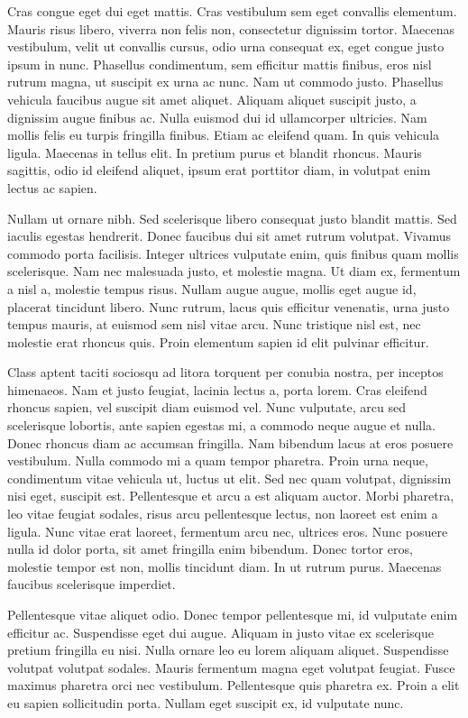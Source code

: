 \documentclass[12pt, a4paper]{article}
\begin{document}
Cras congue eget dui eget mattis. Cras vestibulum sem eget convallis elementum. Mauris risus libero, viverra non felis non, consectetur dignissim tortor. Maecenas vestibulum, velit ut convallis cursus, odio urna consequat ex, eget congue justo ipsum in nunc. Phasellus condimentum, sem efficitur mattis finibus, eros nisl rutrum magna, ut suscipit ex urna ac nunc. Nam ut commodo justo. Phasellus vehicula faucibus augue sit amet aliquet. Aliquam aliquet suscipit justo, a dignissim augue finibus ac. Nulla euismod dui id ullamcorper ultricies. Nam mollis felis eu turpis fringilla finibus. Etiam ac eleifend quam. In quis vehicula ligula. Maecenas in tellus elit. In pretium purus et blandit rhoncus. Mauris sagittis, odio id eleifend aliquet, ipsum erat porttitor diam, in volutpat enim lectus ac sapien.

Nullam ut ornare nibh. Sed scelerisque libero consequat justo blandit mattis. Sed iaculis egestas hendrerit. Donec faucibus dui sit amet rutrum volutpat. Vivamus commodo porta facilisis. Integer ultrices vulputate enim, quis finibus quam mollis scelerisque. Nam nec malesuada justo, et molestie magna. Ut diam ex, fermentum a nisl a, molestie tempus risus. Nullam augue augue, mollis eget augue id, placerat tincidunt libero. Nunc rutrum, lacus quis efficitur venenatis, urna justo tempus mauris, at euismod sem nisl vitae arcu. Nunc tristique nisl est, nec molestie erat rhoncus quis. Proin elementum sapien id elit pulvinar efficitur.

Class aptent taciti sociosqu ad litora torquent per conubia nostra, per inceptos himenaeos. Nam et justo feugiat, lacinia lectus a, porta lorem. Cras eleifend rhoncus sapien, vel suscipit diam euismod vel. Nunc vulputate, arcu sed scelerisque lobortis, ante sapien egestas mi, a commodo neque augue et nulla. Donec rhoncus diam ac accumsan fringilla. Nam bibendum lacus at eros posuere vestibulum. Nulla commodo mi a quam tempor pharetra. Proin urna neque, condimentum vitae vehicula ut, luctus ut elit. Sed nec quam volutpat, dignissim nisi eget, suscipit est. Pellentesque et arcu a est aliquam auctor. Morbi pharetra, leo vitae feugiat sodales, risus arcu pellentesque lectus, non laoreet est enim a ligula. Nunc vitae erat laoreet, fermentum arcu nec, ultrices eros. Nunc posuere nulla id dolor porta, sit amet fringilla enim bibendum. Donec tortor eros, molestie tempor est non, mollis tincidunt diam. In ut rutrum purus. Maecenas faucibus scelerisque imperdiet.

Pellentesque vitae aliquet odio. Donec tempor pellentesque mi, id vulputate enim efficitur ac. Suspendisse eget dui augue. Aliquam in justo vitae ex scelerisque pretium fringilla eu nisi. Nulla ornare leo eu lorem aliquam aliquet. Suspendisse volutpat volutpat sodales. Mauris fermentum magna eget volutpat feugiat. Fusce maximus pharetra orci nec vestibulum. Pellentesque quis pharetra ex. Proin a elit eu sapien sollicitudin porta. Nullam eget suscipit ex, id vulputate nunc.
\end{document}
